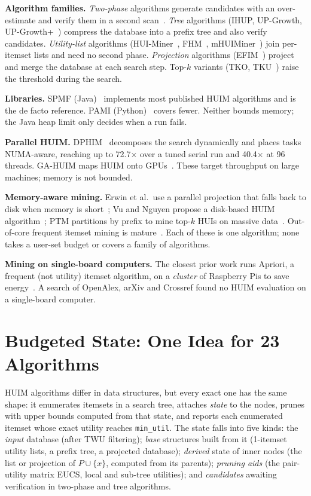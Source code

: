 \documentclass[conference]{IEEEtran}
\begin{document}
\textbf{Algorithm families.} \emph{Two-phase} algorithms generate candidates with an
over-estimate and verify them in a second scan~\cite{twophase2005}. \emph{Tree} algorithms
(IHUP, UP-Growth, UP-Growth+~\cite{upgrowth2013}) compress the database into a prefix tree and
also verify candidates. \emph{Utility-list} algorithms (HUI-Miner~\cite{huiminer2012},
FHM~\cite{fhm2014}, mHUIMiner~\cite{mhuiminer2017}) join per-itemset lists and need no second
phase. \emph{Projection} algorithms (EFIM~\cite{efim2017}) project and merge the database at
each search step. Top-$k$ variants (TKO, TKU~\cite{tko2016}) raise the threshold during the search.

\textbf{Libraries.} SPMF (Java)~\cite{spmf2016} implements most published HUIM algorithms and is
the de facto reference. PAMI (Python)~\cite{pami2024} covers fewer. Neither bounds memory; the
Java heap limit only decides when a run fails.

\textbf{Parallel HUIM.} DPHIM~\cite{dphim2023,dphim2026} decomposes the search dynamically and
places tasks NUMA-aware, reaching up to 72.7$\times$ over a tuned serial run and 40.4$\times$ at
96 threads. GA-HUIM maps HUIM onto GPUs~\cite{gahuim2026}. These target throughput on large
machines; memory is not bounded.

\textbf{Memory-aware mining.} Erwin et al.\ use a parallel projection that falls back to disk when
memory is short~\cite{ctuprol2008}; Vu and Nguyen propose a disk-based HUIM
algorithm~\cite{vu2011}; PTM partitions by prefix to mine top-$k$ HUIs on massive
data~\cite{ptm2020}. Out-of-core frequent itemset mining is mature~\cite{outofcore2006}. Each of
these is one algorithm; none takes a user-set budget or covers a family of algorithms.

\textbf{Mining on single-board computers.} The closest prior work runs Apriori, a frequent (not
utility) itemset algorithm, on a \emph{cluster} of Raspberry Pis to save energy~\cite{picluster2016}.
A search of OpenAlex, arXiv and Crossref found no HUIM evaluation on a single-board computer.

\section{Budgeted State: One Idea for 23 Algorithms}\label{sec:idea}

HUIM algorithms differ in data structures, but every exact one has the same shape: it enumerates
itemsets in a search tree, attaches \emph{state} to the nodes, prunes with upper bounds computed
from that state, and reports each enumerated itemset whose exact utility reaches
\texttt{min\_util}. The state falls into five kinds: the \emph{input} database (after TWU
filtering); \emph{base} structures built from it (1-itemset utility lists, a prefix tree, a
projected database); \emph{derived} state of inner nodes (the list or projection of $P\!\cup\!\{x\}$,
computed from its parents); \emph{pruning aids} (the pair-utility matrix EUCS, local and sub-tree
utilities); and \emph{candidates} awaiting verification in two-phase and tree algorithms.
\end{document}
